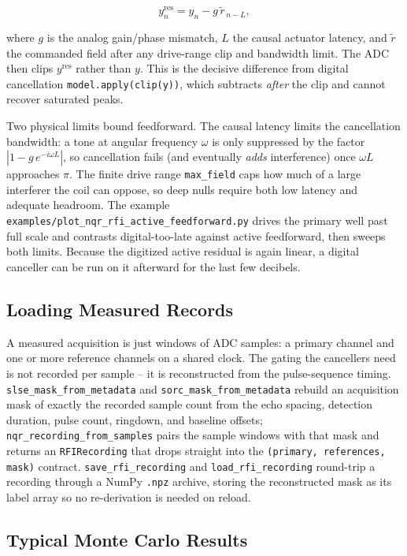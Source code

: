 \documentclass[11pt,oneside]{report}
\newcommand{\code}[1]{\texttt{#1}}
\begin{document}
\[
  y^{\mathrm{res}}_n = y_n - g\,\widetilde{r}_{\,n-L},
\]

where \(g\) is the analog gain/phase mismatch, \(L\) the causal actuator latency,
and \(\widetilde{r}\) the commanded field after any drive-range clip and
bandwidth limit. The ADC then clips \(y^{\mathrm{res}}\) rather than \(y\). This
is the decisive difference from digital cancellation \code{model.apply(clip(y))},
which subtracts \emph{after} the clip and cannot recover saturated peaks.

Two physical limits bound feedforward. The causal latency limits the cancellation
bandwidth: a tone at angular frequency \(\omega\) is only suppressed by the factor
\(|1 - g\,e^{-i\omega L}|\), so cancellation fails (and eventually \emph{adds}
interference) once \(\omega L\) approaches \(\pi\). The finite drive range
\code{max\_field} caps how much of a large interferer the coil can oppose, so deep
nulls require both low latency and adequate headroom. The example
\code{examples/plot\_nqr\_rfi\_active\_feedforward.py} drives the primary well past
full scale and contrasts digital-too-late against active feedforward, then sweeps
both limits. Because the digitized active residual is again linear, a digital
canceller can be run on it afterward for the last few decibels.

\subsection{Loading Measured Records}

A measured acquisition is just windows of ADC samples: a primary channel and one
or more reference channels on a shared clock. The gating the cancellers need is
not recorded per sample -- it is reconstructed from the pulse-sequence timing.
\code{slse\_mask\_from\_metadata} and \code{sorc\_mask\_from\_metadata} rebuild an
acquisition mask of exactly the recorded sample count from the echo spacing,
detection duration, pulse count, ringdown, and baseline offsets;
\code{nqr\_recording\_from\_samples} pairs the sample windows with that mask and
returns an \code{RFIRecording} that drops straight into the
\code{(primary, references, mask)} contract. \code{save\_rfi\_recording} and
\code{load\_rfi\_recording} round-trip a recording through a NumPy \code{.npz}
archive, storing the reconstructed mask as its label array so no re-derivation is
needed on reload.

\subsection{Typical Monte Carlo Results}
\end{document}
